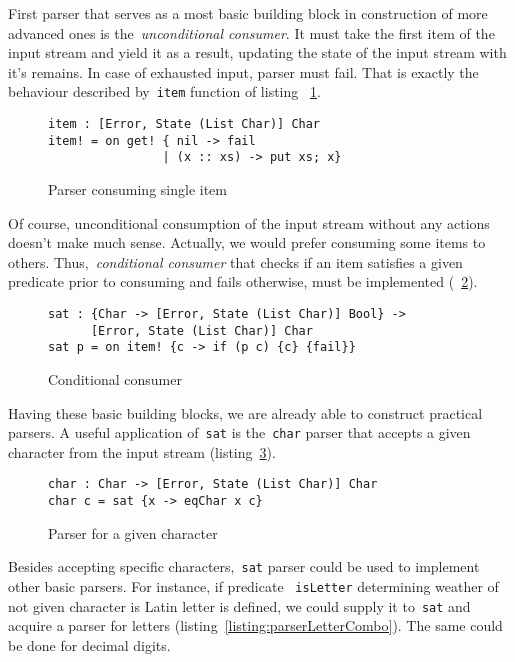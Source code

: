     First parser that serves as a most basic building block in construction of
    more advanced ones is the~\emph{unconditional consumer}.
    It must take the first item
    of the input stream and yield it as a result, updating the state of the input
    stream with it's remains. In case of exhausted input, parser must fail. That
    is exactly the behaviour described by~\lstinline{item} function of listing
    ~\ref{listing:parserItemCombo}.

    \begin{figure}[h]
    \begin{lstlisting}
item : [Error, State (List Char)] Char
item! = on get! { nil -> fail
                | (x :: xs) -> put xs; x}
    \end{lstlisting}
    \caption{Parser consuming single item}
    \label{listing:parserItemCombo}
    \end{figure}

    Of course, unconditional consumption of the input stream without any actions
    doesn't make much sense. Actually, we would prefer consuming some items to others. Thus,~\emph{conditional consumer} that checks if an item satisfies a
    given predicate prior to consuming and fails otherwise, must be
    implemented (~\ref{listing:parserSatCombo}).

    \begin{figure}[h]
    \begin{lstlisting}
sat : {Char -> [Error, State (List Char)] Bool} ->
      [Error, State (List Char)] Char
sat p = on item! {c -> if (p c) {c} {fail}}
    \end{lstlisting}
    \caption{Conditional consumer}
    \label{listing:parserSatCombo}
    \end{figure}

    Having these basic building blocks, we are already able to construct
    practical parsers. A useful application of~\texttt{sat} is
    the~\texttt{char} parser that accepts a given character from the input
    stream (listing~\ref{listing:parserCharCombo}).

    \begin{figure}[h]
    \begin{lstlisting}
char : Char -> [Error, State (List Char)] Char
char c = sat {x -> eqChar x c}
    \end{lstlisting}
    \caption{Parser for a given character}
    \label{listing:parserCharCombo}
    \end{figure}

    Besides accepting specific characters,~\texttt{sat} parser could be used
    to implement other basic parsers. For instance, if predicate
    ~\texttt{isLetter} determining weather of not given character is Latin letter is defined, we could supply it to~\texttt{sat} and acquire a parser for letters (listing~\ref{listing:parserLetterCombo}). The same could be done for decimal digits.

